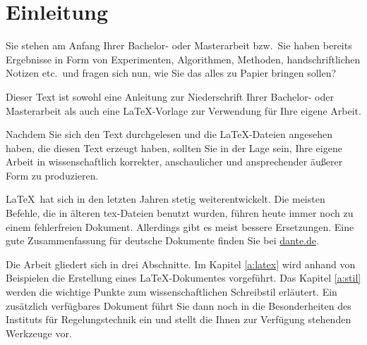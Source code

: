\section* {Einleitung}

Sie stehen am Anfang Ihrer Bachelor- oder Masterarbeit bzw.\ Sie
haben bereits Ergebnisse in Form von Experimenten, Algorithmen,
Methoden, handschriftlichen Notizen etc.\ und fragen sich nun, wie
Sie das alles zu Papier bringen sollen?

Dieser Text ist sowohl eine Anleitung zur Niederschrift Ihrer
Bachelor- oder Masterarbeit als auch eine \LaTeX-Vorlage zur Verwendung für
Ihre eigene Arbeit.

Nachdem Sie sich den Text durchgelesen und die \LaTeX-Dateien
angesehen haben, die diesen Text erzeugt haben, sollten Sie in der
Lage sein, Ihre eigene Arbeit in wissenschaftlich korrekter,
anschaulicher und ansprechender äußerer Form zu produzieren.

\LaTeX\ hat sich in den letzten Jahren stetig weiterentwickelt.
Die meisten Befehle, die in älteren tex-Dateien benutzt wurden, führen
heute immer noch zu einem fehlerfreien Dokument. Allerdings gibt
es meist bessere Ersetzungen. Eine gute Zusammenfassung für deutsche 
Dokumente finden Sie bei
\href{ftp://ftp.dante.de/pub/tex/info/german/l2tabu/l2tabu.pdf}{dante.de}.

Die Arbeit gliedert sich in drei Abschnitte. Im Kapitel
\ref{a:latex} wird anhand von Beispielen die Erstellung eines
\LaTeX-Dokumentes vorgeführt. Das Kapitel \ref{a:stil} werden die
wichtige Punkte zum wissenschaftlichen Schreibstil erläutert.
Ein zusätzlich verfügbares Dokument führt Sie dann noch in die 
Besonderheiten des Instituts für Regelungstechnik ein und stellt
die Ihnen zur Verfügung stehenden Werkzeuge vor.